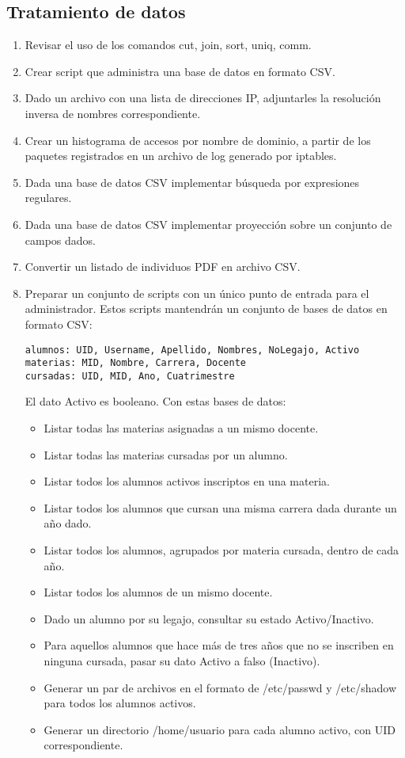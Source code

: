 \subsection{Tratamiento de datos}
\begin{enumerate}
	\item 
Revisar el uso de los comandos cut, join, sort, uniq, comm.
	\item 
Crear script que administra una base de datos en formato CSV.
	\item 
Dado un archivo con una lista de direcciones IP, adjuntarles la resolución inversa de nombres correspondiente.
	\item 
Crear un histograma de accesos por nombre de dominio, a partir de los paquetes registrados en un archivo de log generado por iptables. 
	\item 
Dada una base de datos CSV implementar búsqueda por expresiones regulares.
	\item 
Dada una base de datos CSV implementar proyección sobre un conjunto de campos dados.
	\item 
Convertir un listado de individuos PDF en archivo CSV.
	\item 
Preparar un conjunto de scripts con un único punto de entrada para el administrador. Estos scripts mantendrán un conjunto de bases de datos en formato CSV:
\begin{lstlisting}
alumnos: UID, Username, Apellido, Nombres, NoLegajo, Activo
materias: MID, Nombre, Carrera, Docente
cursadas: UID, MID, Ano, Cuatrimestre
\end{lstlisting}
El dato Activo es booleano. Con estas bases de datos:
\begin{itemize}
	\item 
Listar todas las materias asignadas a un mismo docente.
	\item 
Listar todas las materias cursadas por un alumno.
	\item 
Listar todos los alumnos activos inscriptos en una materia.
	\item 
Listar todos los alumnos que cursan una misma carrera dada durante un año dado.
	\item 
Listar todos los alumnos, agrupados por materia cursada, dentro de cada año. 
	\item 
Listar todos los alumnos de un mismo docente.
	\item 
Dado un alumno por su legajo, consultar su estado Activo/Inactivo.
	\item 
Para aquellos alumnos que hace más de tres años que no se inscriben en ninguna cursada, pasar su dato Activo a falso (Inactivo).
	\item 
Generar un par de archivos en el formato de /etc/passwd y /etc/shadow para todos los alumnos activos.
	\item 
Generar un directorio /home/usuario para cada alumno activo, con UID correspondiente.
\end{itemize}
\end{enumerate}


